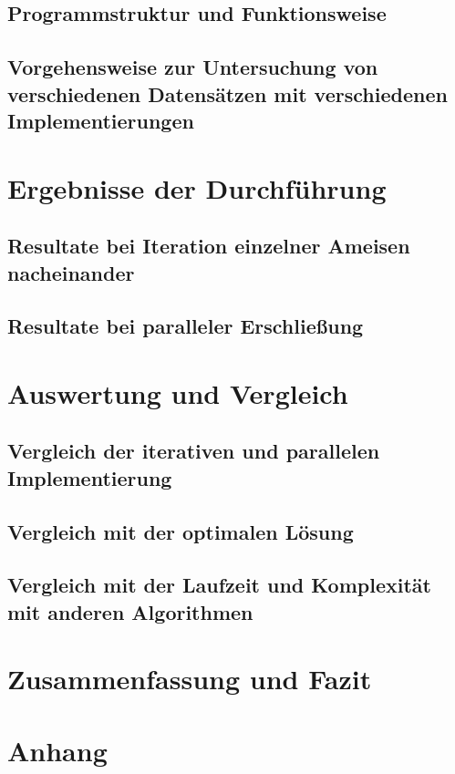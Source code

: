 \documentclass[doktyp=barbeit, sprache=german]{TUBAFarbeiten}
\begin{document}
\subsection{Programmstruktur und Funktionsweise}
\subsection{Vorgehensweise zur Untersuchung von verschiedenen Datensätzen mit verschiedenen Implementierungen}
\section{Ergebnisse der Durchführung}
\subsection{Resultate bei Iteration einzelner Ameisen nacheinander}
\subsection{Resultate bei paralleler Erschließung}
\section{Auswertung und Vergleich}
\subsection{Vergleich der iterativen und parallelen Implementierung}
\subsection{Vergleich mit der optimalen Lösung}
\subsection{Vergleich mit der Laufzeit und Komplexität mit anderen Algorithmen}
\section{Zusammenfassung und Fazit}
\section{Anhang}
\newpage
{}
\end{document}
